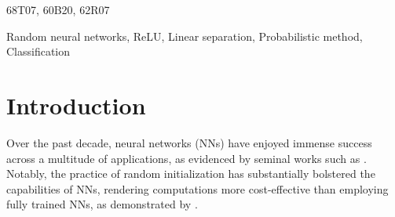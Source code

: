 \documentclass[aoap]{imsart}
\numberwithin{equation}{section}
\theoremstyle{definition}
\theoremstyle{remark}
\numberwithin{equation}{section}
\newcommand{\0}{\mathbf{0}}
\newcommand{\1}{\mathbf{1}}
\numberwithin{equation}{section}
\begin{document}
\begin{frontmatter}
\begin{abstract}
Recently, neural networks have demonstrated remarkable capabilities in mapping two arbitrary sets to two linearly separable sets. The prospect of achieving this with randomly initialized neural networks is particularly appealing due to the computational efficiency compared to fully trained networks. This paper contributes by establishing that, given sufficient width, a randomly initialized one-layer neural network can, with high probability, transform two sets into two linearly separable sets without any training. Moreover, we furnish precise bounds on the necessary width of the neural network for this phenomenon to occur. Our initial bound exhibits exponential dependence on the input dimension while maintaining polynomial dependence on all other parameters. In contrast, our second bound is independent of input dimension, effectively surmounting the curse of dimensionality. The main tools used in our proof heavily relies on a fusion of geometric principles and concentration of random matrices.  






\end{abstract}

\begin{keyword}[class=MSC2020]
68T07, 60B20, 62R07
\end{keyword}

\begin{keyword}
Random neural networks, ReLU, Linear separation, Probabilistic method, Classification
\end{keyword}

\end{frontmatter}

\tableofcontents


\section{Introduction}



Over the past decade, neural networks (NNs) have enjoyed immense success across a multitude of applications, as evidenced by seminal works such as \cite{lecun2015deep, schmidhuber2015deep, goodfellow2016deep}. Notably, the practice of random initialization has substantially bolstered the capabilities of NNs, rendering computations more cost-effective than employing fully trained NNs, as demonstrated by \cite{he2015delving, goodfellow2016deep, arpit2019benefits}.
\end{document}
